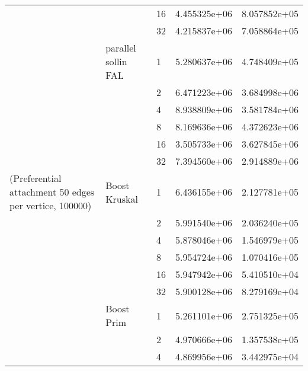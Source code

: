 \begin{tabular}{lllrr}
                                                       &                     & 16 &  4.455325e+06 &  8.057852e+05 \\
                                                       &                     & 32 &  4.215837e+06 &  7.058864e+05 \\
                                                       & parallel sollin FAL & 1  &  5.280637e+06 &  4.748409e+05 \\
                                                       &                     & 2  &  6.471223e+06 &  3.684998e+06 \\
                                                       &                     & 4  &  8.938809e+06 &  3.581784e+06 \\
                                                       &                     & 8  &  8.169636e+06 &  4.372623e+06 \\
                                                       &                     & 16 &  3.505733e+06 &  3.627845e+06 \\
                                                       &                     & 32 &  7.394560e+06 &  2.914889e+06 \\
(Preferential attachment 50 edges per vertice, 100000) & Boost Kruskal & 1  &  6.436155e+06 &  2.127781e+05 \\
                                                       &                     & 2  &  5.991540e+06 &  2.036240e+05 \\
                                                       &                     & 4  &  5.878046e+06 &  1.546979e+05 \\
                                                       &                     & 8  &  5.954724e+06 &  1.070416e+05 \\
                                                       &                     & 16 &  5.947942e+06 &  5.410510e+04 \\
                                                       &                     & 32 &  5.900128e+06 &  8.279169e+04 \\
                                                       & Boost Prim & 1  &  5.261101e+06 &  2.751325e+05 \\
                                                       &                     & 2  &  4.970666e+06 &  1.357538e+05 \\
                                                       &                     & 4  &  4.869956e+06 &  3.442975e+04 \\

\end{tabular}
